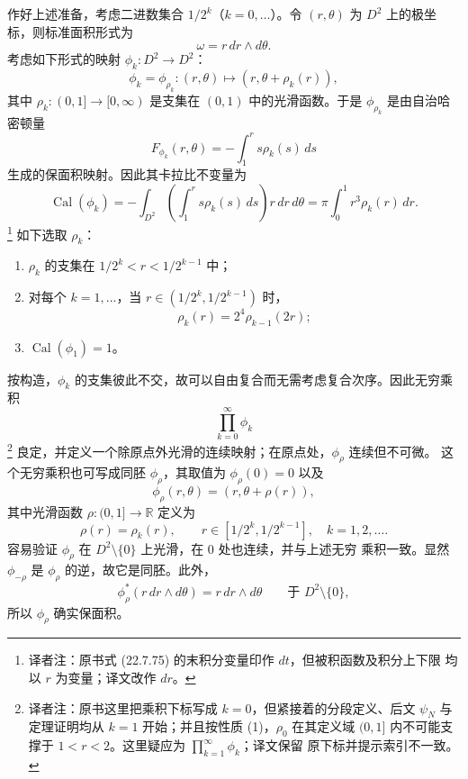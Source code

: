 \begin{example}
\label{ex:22-wild-area-preserving-homeomorphism}
作好上述准备，考虑二进数集合 $1/2^k$（$k=0,\ldots$）。令 $(r,\theta)$ 为 $D^2$
上的极坐标，则标准面积形式为
\[
 \omega=r\,dr\wedge d\theta.
\]
考虑如下形式的映射 $\phi_k:D^2\to D^2$：
\[
 \phi_k=\phi_{\rho_k}:(r,\theta)\longmapsto(r,\theta+\rho_k(r)),
\]
其中 $\rho_k:(0,1]\to[0,\infty)$ 是支集在 $(0,1)$ 中的光滑函数。于是
$\phi_{\rho_k}$ 是由自治哈密顿量
\[
 F_{\phi_k}(r,\theta)=-\int_1^r s\rho_k(s)\,ds
\]
生成的保面积映射。因此其卡拉比不变量为
\begin{equation}
 \operatorname{Cal}(\phi_k)
 =-\int_{D^2}\left(\int_1^r s\rho_k(s)\,ds\right)r\,dr\,d\theta
 =\pi\int_0^1r^3\rho_k(r)\,dr.
 \label{eq:22-twist-calabi}
\end{equation}
\footnote{译者注：原书式 (22.7.75) 的末积分变量印作 $dt$，但被积函数及积分上下限
均以 $r$ 为变量；译文改作 $dr$。}
如下选取 $\rho_k$：
\begin{enumerate}[label=(\arabic*)]
\item $\rho_k$ 的支集在 $1/2^k<r<1/2^{k-1}$ 中；
\item 对每个 $k=1,\ldots$，当 $r\in(1/2^k,1/2^{k-1})$ 时，
\begin{equation}
 \rho_k(r)=2^4\rho_{k-1}(2r);
 \label{eq:22-twist-rescaling}
\end{equation}
\item $\operatorname{Cal}(\phi_1)=1$。
\end{enumerate}

按构造，$\phi_k$ 的支集彼此不交，故可以自由复合而无需考虑复合次序。因此无穷乘积
\[
 \prod_{k=0}^\infty\phi_k
\]
\footnote{译者注：原书这里把乘积下标写成 $k=0$，但紧接着的分段定义、后文
$\psi_N$ 与定理证明均从 $k=1$ 开始；并且按性质 (1)，$\rho_0$ 在其定义域
$(0,1]$ 内不可能支撑于 $1<r<2$。这里疑应为 $\prod_{k=1}^\infty\phi_k$；译文保留
原下标并提示索引不一致。}
良定，并定义一个除原点外光滑的连续映射；在原点处，$\phi_\rho$ 连续但不可微。
这个无穷乘积也可写成同胚 $\phi_\rho$，其取值为 $\phi_\rho(0)=0$ 以及
\[
 \phi_\rho(r,\theta)=(r,\theta+\rho(r)),
\]
其中光滑函数 $\rho:(0,1]\to\mathbb R$ 定义为
\[
 \rho(r)=\rho_k(r),\qquad
 r\in[1/2^k,1/2^{k-1}],\quad k=1,2,\ldots.
\]
容易验证 $\phi_\rho$ 在 $D^2\setminus\{0\}$ 上光滑，在 $0$ 处也连续，并与上述无穷
乘积一致。显然 $\phi_{-\rho}$ 是 $\phi_\rho$ 的逆，故它是同胚。此外，
\[
 \phi_\rho^*(r\,dr\wedge d\theta)=r\,dr\wedge d\theta
 \qquad\text{于 }D^2\setminus\{0\},
\]
所以 $\phi_\rho$ 确实保面积。
\end{example}

